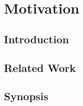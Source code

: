 \chapter{Motivation}
\section{Introduction}








\section{Related Work}









\section{Synopsis}

